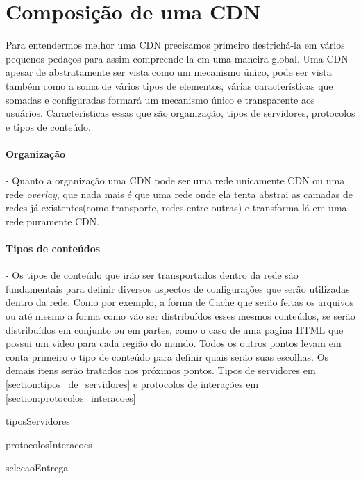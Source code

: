 \section{Composi\c{c}\~ao de uma CDN} \label{sec:composicao}

Para entendermos melhor uma CDN precisamos primeiro destrich\'a-la em v\'arios pequenos peda\c{c}os para assim compreende-la em uma maneira global.
\newline
Uma CDN apesar de abstratamente ser vista como um mecanismo \'unico, pode ser vista tamb\'em como a soma de v\'arios tipos de elementos, v\'arias caracter\'isticas que somadas e configuradas formar\'a um mecanismo \'unico e transparente aos usu\'arios. Caracter\'isticas essas que s\~ao organiza\c{c}\~ao, tipos de servidores, protocolos e tipos de conte\'udo.

\paragraph{Organiza\c{c}\~ao}- Quanto a organiza\c{c}\~ao uma CDN pode ser uma rede unicamente CDN ou uma rede \textit{overlay}, que nada mais \'e que uma rede onde ela tenta abstrai as camadas de redes j\'a existentes(como transporte, redes entre outras) e transforma-l\'a em uma rede puramente CDN.

\paragraph{Tipos de conte\'udos}- Os tipos de conte\'udo que ir\~ao ser transportados dentro da rede s\~ao fundamentais para definir diversos aspectos de configura\c{c}\~oes que ser\~ao utilizadas dentro da rede. Como por exemplo, a forma de Cache que ser\~ao feitas os arquivos ou at\'e mesmo a forma como v\~ao ser distribu\'idos esses mesmos conte\'udos, se ser\~ao distribu\'idos em conjunto ou em partes, como o caso de uma pagina HTML que possui um video para cada regi\~ao do  mundo. 
\newline
Todos os outros pontos levam em conta primeiro o tipo de conte\'udo para definir quais ser\~ao suas escolhas.
\newline
Os demais itens ser\~ao tratados nos pr\'oximos pontos. Tipos de servidores em \ref{section:tipos_de_servidores} e protocolos de intera\c{c}\~oes em \ref{section:protocolos_interacoes}

{tiposServidores}

{protocolosInteracoes}

{selecaoEntrega}
